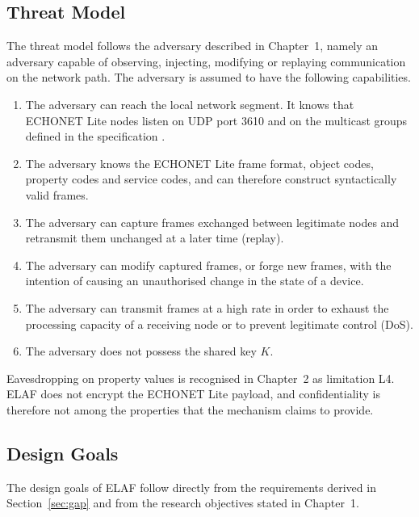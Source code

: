 \subsection{Threat Model}
\label{sec:m-threat}

The threat model follows the adversary described in Chapter~1, namely an adversary capable of observing, injecting, modifying or replaying communication on the network path. The adversary is assumed to have the following capabilities.

\begin{enumerate}
  \item The adversary can reach the local network segment. It knows that ECHONET Lite nodes listen on UDP port 3610 and on the multicast groups defined in the specification \citep{ECHONETPart2}.
  \item The adversary knows the ECHONET Lite frame format, object codes, property codes and service codes, and can therefore construct syntactically valid frames.
  \item The adversary can capture frames exchanged between legitimate nodes and retransmit them unchanged at a later time (replay).
  \item The adversary can modify captured frames, or forge new frames, with the intention of causing an unauthorised change in the state of a device.
  \item The adversary can transmit frames at a high rate in order to exhaust the processing capacity of a receiving node or to prevent legitimate control (DoS).
  \item The adversary does not possess the shared key $K$.
\end{enumerate}

Eavesdropping on property values is recognised in Chapter~2 as limitation L4. ELAF does not encrypt the ECHONET Lite payload, and confidentiality is therefore not among the properties that the mechanism claims to provide.

\subsection{Design Goals}
\label{sec:m-goals}

The design goals of ELAF follow directly from the requirements derived in Section~\ref{sec:gap} and from the research objectives stated in Chapter~1.

